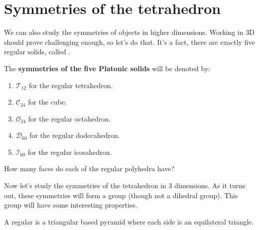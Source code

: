 \documentclass{ximera}
\begin{document}
\section{Symmetries of the tetrahedron}


We can also study the symmetries of objects in higher
dimensions. Working in $3$D should prove challenging enough, so let's
do that. It's a fact, there are exactly five regular solids, called
.

\begin{definition}
  The \textbf{symmetries of the five Platonic solids} will be denoted
  by:
  \begin{enumerate}
  \item $\mathcal{T}_{12}$ for the regular tetrahedron.
  \item $\mathcal{C}_{24}$ for the cube.
  \item $\mathcal{O}_{24}$ for the regular octahedron.
  \item $\mathcal{D}_{60}$ for the regular dodecahedron.
  \item $\mathcal{I}_{60}$ for the regular icosahedron.
  \end{enumerate}
\end{definition}

\begin{exercise}
  How many faces do each of the regular polyhedra have?
\end{exercise}


Now let's study the symmetries of the tetrahedron in $3$ dimensions.
As it turns out, these symmetries will form a group (though not a
dihedral group). This group will have some interesting properties.


A regular  is a triangular based pyramid where each
side is an equilateral triangle.
\end{document}
